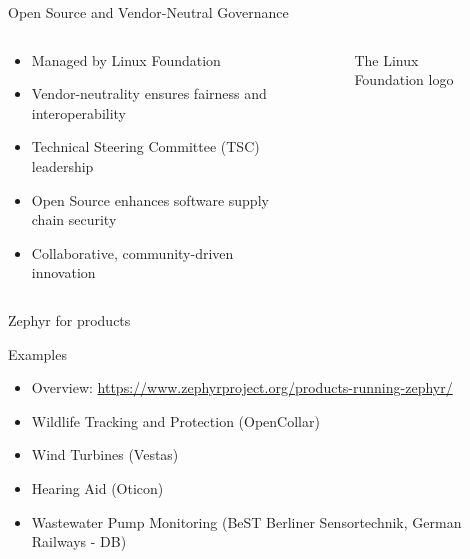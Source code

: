 \documentclass[10pt, aspectratio=169]{beamer}
\begin{document}
\begin{frame}[fragile]{Open Source and Vendor-Neutral Governance}
  \begin{columns}
    \begin{column}{0.6\textwidth}
      \begin{itemize}
        \item Managed by Linux Foundation
        \item Vendor-neutrality ensures fairness and interoperability
        \item Technical Steering Committee (TSC) leadership
        \item Open Source enhances software supply chain security
        \item Collaborative, community-driven innovation
      \end{itemize}
    \end{column}
    \begin{column}{0.4\textwidth}
      \begin{figure}
        
        \caption*{The Linux Foundation logo}
      \end{figure}
    \end{column}
  \end{columns}
\end{frame}
\begin{frame}[fragile]{Zephyr for products}

  \begin{block}{Examples}
    \begin{itemize}
       \item Overview: {\scriptsize \url{https://www.zephyrproject.org/products-running-zephyr/}}
       \item Wildlife Tracking and Protection (OpenCollar)
       \item Wind Turbines (Vestas)
       \item Hearing Aid (Oticon)
       \item Wastewater Pump Monitoring (BeST Berliner Sensortechnik, German Railways - DB)
    \end{itemize}

  \end{block}
\end{frame}
\end{document}
